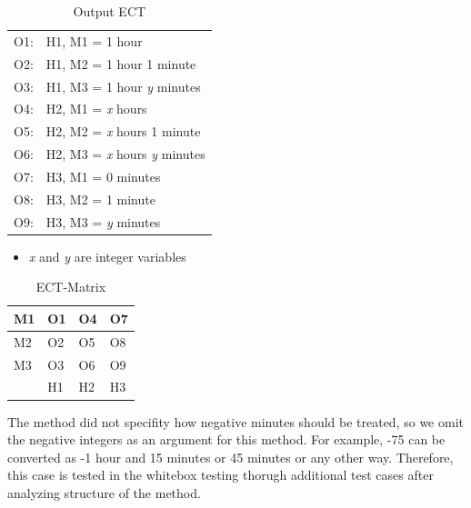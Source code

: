 \documentclass[fontsize=12pt,paper=letter,twoside]{scrartcl}
\begin{document}
\begin{itemize}
\begin{table}[!htb]
\caption{Output ECT}
\label{output-ectl}
\begin{tabular}{ll}
O1: &  H1, M1 = 1 hour                                    \\
O2: &  H1, M2 = 1 hour 1 minute                                    \\
O3: &  H1, M3 = 1 hour \emph{y} minutes                        \\
O4: &  H2, M1 = \emph{x} hours\\
O5: &  H2, M2 = \emph{x} hours 1 minute                     \\
O6: &  H2, M3 = \emph{x} hours \emph{y} minutes          \\                        
O7: &  H3, M1 = 0 minutes\\
O8: &  H3, M2 = 1 minute                      \\
O9: &  H3, M3 = \emph{y} minutes          \\                   
\end{tabular}
    \begin{itemize}
      \small
      \item \emph{x} and \emph{y} are integer variables
    \end{itemize}
\end{table}

\begin{table}[!htb]
\centering
\caption{ECT-Matrix}
\label{ect-matrix}
\begin{tabular}{|l|l|l|l|}
\hline
M1 & O1 & O4 & O7 \\ \hline
M2 & O2 & O5 & O8 \\ \hline
M3 & O3 & O6 & O9 \\ \hline
     & H1 & H2 & H3 \\ \hline
\end{tabular}
\end{table}
The method did not specifity how negative minutes should be treated, so we omit  the negative integers as an argument for this method. For example, -75 can be converted as -1 hour and 15 minutes or 45 minutes or any other way. Therefore, this case is tested in the whitebox testing thorugh additional test cases after analyzing structure of the method.


\end{itemize}
\end{document}
